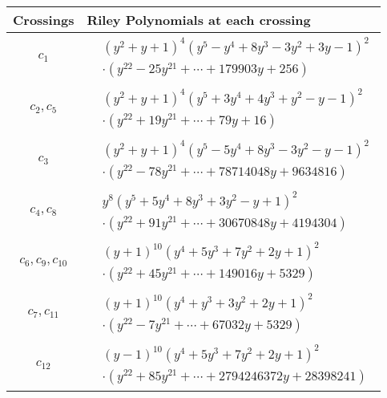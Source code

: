 \documentclass[1p]{elsarticle_modified}
\theoremstyle{definition}
\begin{document}
\begin{tabular}{m{50pt}|m{274pt}}
Crossings & \hspace{64pt}Riley Polynomials at each crossing \\
\hline $$\begin{aligned}c_{1}\end{aligned}$$&$\begin{aligned}
&(y^2+y+1)^4(y^5- y^4+8 y^3-3 y^2+3 y-1)^2\\
&\cdot(y^{22}-25 y^{21}+\cdots+179903 y+256)
\end{aligned}$\\
\hline $$\begin{aligned}c_{2},c_{5}\end{aligned}$$&$\begin{aligned}
&(y^2+y+1)^4(y^5+3 y^4+4 y^3+y^2- y-1)^2\\
&\cdot(y^{22}+19 y^{21}+\cdots+79 y+16)
\end{aligned}$\\
\hline $$\begin{aligned}c_{3}\end{aligned}$$&$\begin{aligned}
&(y^2+y+1)^4(y^5-5 y^4+8 y^3-3 y^2- y-1)^2\\
&\cdot(y^{22}-78 y^{21}+\cdots+78714048 y+9634816)
\end{aligned}$\\
\hline $$\begin{aligned}c_{4},c_{8}\end{aligned}$$&$\begin{aligned}
&y^8(y^5+5 y^4+8 y^3+3 y^2- y+1)^2\\
&\cdot(y^{22}+91 y^{21}+\cdots+30670848 y+4194304)
\end{aligned}$\\
\hline $$\begin{aligned}c_{6},c_{9},c_{10}\end{aligned}$$&$\begin{aligned}
&(y+1)^{10}(y^4+5 y^3+7 y^2+2 y+1)^2\\
&\cdot(y^{22}+45 y^{21}+\cdots+149016 y+5329)
\end{aligned}$\\
\hline $$\begin{aligned}c_{7},c_{11}\end{aligned}$$&$\begin{aligned}
&(y+1)^{10}(y^4+y^3+3 y^2+2 y+1)^2\\
&\cdot(y^{22}-7 y^{21}+\cdots+67032 y+5329)
\end{aligned}$\\
\hline $$\begin{aligned}c_{12}\end{aligned}$$&$\begin{aligned}
&(y-1)^{10}(y^4+5 y^3+7 y^2+2 y+1)^2\\
&\cdot(y^{22}+85 y^{21}+\cdots+2794246372 y+28398241)
\end{aligned}$\\
\hline
\end{tabular}
\vskip 2pc
\end{document}
